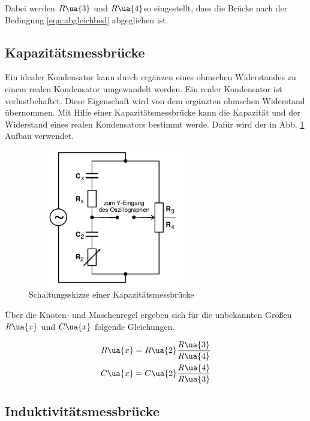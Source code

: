 Dabei werden $R\ua{3}$ und $R\ua{4}$so eingestellt, dass die Brücke nach
der Bedingung \eqref{eqn:abgleichbed} abgeglichen ist.

\subsection{Kapazitätsmessbrücke}

Ein idealer Kondensator kann durch ergänzen eines ohmschen Widerstandes zu einem
realen Kondensator umgewandelt werden. Ein realer Kondensator ist verlustbehaftet.
Diese Eigenschaft wird von dem ergänzten ohmschen Widerstand übernommen.
Mit Hilfe einer Kapazitätsmessbrücke kann die Kapazität und der Widerstand eines
realen Kondensators bestimmt werde.
Dafür wird der in Abb. \ref{fig:Kapazitätsmessbrücke} Aufbau verwendet.

\begin{figure}
  \includegraphics[width=7.50cm, height=6cm]{V302_Kapazitätsmessbrücke.png}
  \caption{Schaltungsskizze einer Kapazitätsmessbrücke\cite{anleitung01}}
  \label{fig:Kapazitätsmessbrücke}
\end{figure}

Über die Knoten- und Maschenregel ergeben sich für die unbekannten Größen
$R\ua{x}$ und $C\ua{x}$ folgende Gleichungen.

\begin{align}
  R\ua{x} &= R\ua{2}\frac{R\ua{3}}{R\ua{4}}\label{KapazitätsmessbrückeRx}\\
  C\ua{x} &= C\ua{2}\frac{R\ua{4}}{R\ua{3}}\label{KapazitätsmessbrückeLx}
\end{align}

\subsection{Induktivitätsmessbrücke}

